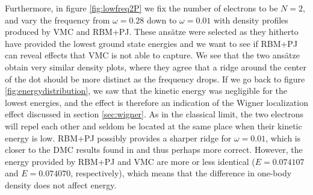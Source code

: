 Furthermore, in figure \eqref{fig:lowfreq2P} we fix the number of electrons to be $N=2$, and vary the frequency from $\omega=0.28$ down to $\omega=0.01$ with density profiles produced by VMC and RBM+PJ. These ansätze were selected as they hitherto have provided the lowest ground state energies and we want to see if RBM+PJ can reveal effects that VMC is not able to capture. We see that the two ansätze obtain very similar density plots, where they agree that a ridge around the center of the dot should be more distinct as the frequency drops. If we go back to figure \eqref{fig:energydistribution}, we saw that the kinetic energy was negligible for the lowest energies, and the effect is therefore an indication of the Wigner localization effect discussed in section \ref{sec:wigner}. As in the classical limit, the two electrons will repel each other and seldom be located at the same place when their kinetic energy is low. RBM+PJ possibly provides a sharper ridge for $\omega=0.01$, which is closer to the DMC results found in \citet{hogberget_quantum_2013} and thus perhaps more correct. However, the energy provided by RBM+PJ and VMC are more or less identical ($E=0.074107$ and $E=0.074070$, respectively), which means that the difference in one-body density does not affect energy.

